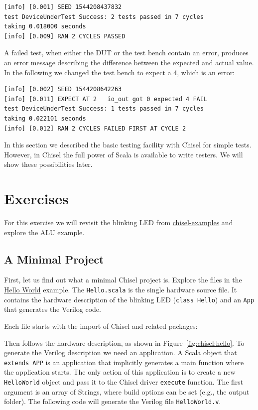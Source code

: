 \documentclass[%
    10pt, %
    headinclude, footexclude,
    openright, %
    notitlepage,
    cleardoubleempty,
    headsepline,
    pointlessnumbers,
    bibtotoc, idxtotoc,
    ]{scrbook}
\newcommand{\code}[1]{{\small{\texttt{#1}}}}
\newcommand{\myref}[2]{\href{#1}{#2}}
\begin{document}
\begin{verbatim}
[info] [0.001] SEED 1544208437832
test DeviceUnderTest Success: 2 tests passed in 7 cycles
taking 0.018000 seconds
[info] [0.009] RAN 2 CYCLES PASSED
\end{verbatim}

\noindent A failed test, when either the DUT or the test bench contain an error,
produces an error message describing the difference between the expected and actual
value. In the following we changed the test bench to expect a 4, which is an error:

\begin{verbatim}
[info] [0.002] SEED 1544208642263
[info] [0.011] EXPECT AT 2   io_out got 0 expected 4 FAIL
test DeviceUnderTest Success: 1 tests passed in 7 cycles
taking 0.022101 seconds
[info] [0.012] RAN 2 CYCLES FAILED FIRST AT CYCLE 2
\end{verbatim}

In this section we described the basic testing facility with Chisel for simple tests.
However, in Chisel the full power of Scala is available to write testers.
We will show these possibilities later.

\section{Exercises}

For this exercise we will revisit the blinking LED from
\myref{https://github.com/schoeberl/chisel-examples}{chisel-examples}
and explore the ALU example.

\subsection{A Minimal Project}

First, let us find out what a minimal Chisel project is. Explore the files in the
\myref{https://github.com/schoeberl/chisel-examples/tree/master/hello-world}{Hello World}
example.
The \code{Hello.scala} is the single hardware source file.
It contains the hardware description of the blinking LED (\code{class Hello})
and an \code{App} that generates the Verilog code.

Each file starts with the import of Chisel and related packages:



\noindent Then follows the hardware description, as shown in Figure~\ref{fig:chisel:hello}.
To generate the Verilog description we need an application. A Scala object that \code{extends APP}
is an application that implicitly generates a main function where the application starts.
The only action of this application is to create a new \code{HelloWorld} object and pass it
to the Chisel driver \code{execute} function. The first argument is an array of Strings,
where build options can be set (e.g., the output folder). The following code will
generate the Verilog file \code{HelloWorld.v}.
\end{document}
